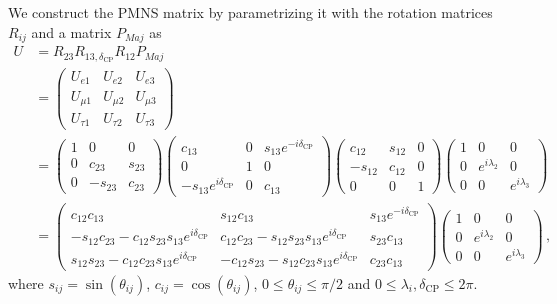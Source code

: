 We construct the PMNS matrix by parametrizing it with the rotation matrices $R_{ij}$ and a matrix $P_{Maj}$ as
\begin{align}\label{PMNS_def}
    U &= R_{23}R_{13,\delta_{\text{CP}}}R_{12}P_{Maj} \nonumber \\
     &= \begin{pmatrix}
        U_{e 1} & U_{e2} & U_{e3} \\
         U_{\mu 1} & U_{\mu 2} & U_{\mu 3} \\
         U_{\tau 1} & U_{\tau 2} & U_{\tau 3}
      \end{pmatrix} \nonumber \\
      & = \begin{pmatrix}1 & 0 & 0 \\ 0 & c_{23} & s_{23} \\ 0 & -s_{23} & c_{23}\end{pmatrix}
\begin{pmatrix}c_{13} & 0 & s_{13} e^{-i \delta_{\mathrm{CP}}} \\ 0 & 1 & 0 \\ -s_{13} e^{i \delta_{\mathrm{CP}}} & 0 & c_{13}\end{pmatrix}
\begin{pmatrix}c_{12} & s_{12} & 0 \\ -s_{12} & c_{12} & 0 \\ 0 & 0 & 1\end{pmatrix}
\begin{pmatrix}1 & 0 & 0 \\ 0 & e^{i \lambda_{2}} & 0 \\ 0 & 0 & e^{i \lambda_{3}}\end{pmatrix}
\nonumber \\
 &=\begin{pmatrix}c_{12} c_{13} & s_{12} c_{13} & s_{13} e^{-i \delta_{\mathrm{CP}}} \\ 
        -s_{12} c_{23}-c_{12} s_{23} s_{13}e^{i \delta_{\mathrm{CP}}} & c_{12} c_{23}-s_{12} s_{23} s_{13}e^{i \delta_{\mathrm{CP}}} & s_{23} c_{13} \\ 
        s_{12} s_{23}-c_{12} c_{23} s_{13}e^{i \delta_{\mathrm{CP}}}  & -c_{12} s_{23}-s_{12} c_{23} s_{13}e^{i \delta_{\mathrm{CP}}} & c_{23} c_{13}
    \end{pmatrix}
    \begin{pmatrix}1 & 0 & 0 \\ 0 & e^{i \lambda_{2}} & 0 \\ 0 & 0 & e^{i \lambda_{3}}\end{pmatrix}\,,
\end{align}
where $s_{ij} = \sin(\theta_{ij})$, $c_{ij} = \cos(\theta_{ij})$, $0 \leq \theta_{ij} \leq \pi/2$ and $ 0 \leq \lambda_{i},\delta_\mathrm{CP} \leq 2\pi$. 

